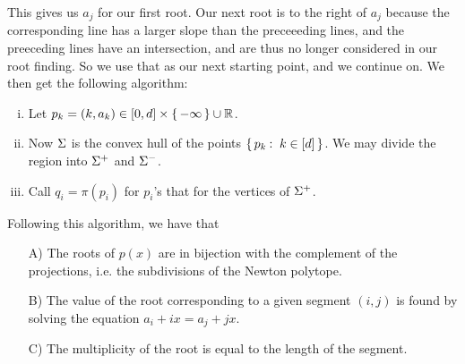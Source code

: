\documentclass[12pt]{memoir}
\theoremstyle{definition}
\begin{document}
This gives us $a_j$ for our first root. Our next root is to the right of $a_j$ because the corresponding line has a larger slope than the preceeeding lines, and the preeceding lines have an intersection, and are thus no longer considered in our root finding. So we use that as our next starting point, and we continue on.
We then get the following algorithm:
\begin{enumerate}[i.]
    \item Let $p_k=(k,a_k)\in\left\lbrack0,d\right\rbrack\times\{\,-\infty\,\}\cup\mathbb{R}$.
    \item Now $\Sigma$ is the convex hull of the points $\{\,p_k\mathbin{:}\ k\in[d]\,\}$. We may divide the region into $\Sigma^+$ and $\Sigma^-$.
    \item Call $q_i=\pi(p_i)$ for $p_i$'s that for the vertices of $\Sigma^+$.
\end{enumerate}

Following this algorithm, we have that
\begin{itemize}
    \item [A)] The roots of $p(x)$ are in bijection with the complement of the projections, i.e. the subdivisions of the Newton polytope.
    \item [B)] The value of the root corresponding to a given segment $(i,j)$ is found by solving the equation $a_i + ix = a_j  +jx$.
    \item [C)] The multiplicity of the root is equal to the length of the segment.
\end{itemize}
\end{document}
